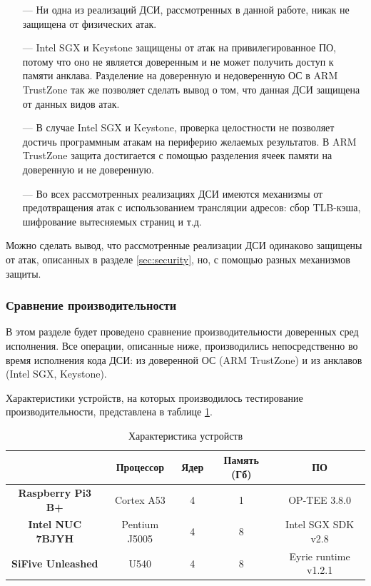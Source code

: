 \begin{itemize}
	\item [---] Ни одна из реализаций ДСИ, рассмотренных в данной работе, никак не защищена от физических атак.
	\item [---] Intel SGX и Keystone защищены от атак на привилегированное ПО, потому что оно не является доверенным и не может получить доступ к памяти анклава. Разделение на доверенную и недоверенную ОС в ARM TrustZone так же позволяет сделать вывод о том, что данная ДСИ защищена от данных видов атак.
	\item [---] В случае Intel SGX и Keystone, проверка целостности не позволяет достичь программным атакам на периферию желаемых результатов. В ARM TrustZone защита достигается с помощью разделения ячеек памяти на доверенную и не доверенную.
	\item [---] Во всех рассмотренных реализациях ДСИ имеются механизмы от предотвращения атак с использованием трансляции адресов: сбор TLB-кэша, шифрование вытесняемых страниц и т.д.
\end{itemize}

Можно сделать вывод, что рассмотренные реализации ДСИ одинаково защищены от атак, описанных в разделе \ref{sec:security}, но, с помощью разных механизмов защиты.

\subsubsection{Сравнение производительности}

В этом разделе будет проведено сравнение производительности доверенных сред исполнения. Все операции, описанные ниже, производились непосредственно во время исполнения кода ДСИ: из доверенной ОС (ARM TrustZone) и из анклавов (Intel SGX, Keystone).

Характеристики устройств, на которых производилось тестирование производительности, представлена в таблице \ref{table:perf-devices}.

\begin{table}[!htb]
	\begin{center}
		\caption{Характеристика устройств}
		\label{table:perf-devices}
		\begin{tabular}{|c|c|c|c|c|}
			\hline
			& \bfseries Процессор & \bfseries Ядер & \bfseries Память (Гб) & \bfseries ПО \\
			\hline
			\bfseries Raspberry Pi3 B+ & Cortex A53 & 4 & 1 & OP-TEE 3.8.0\\ \hline
			\bfseries Intel NUC 7BJYH & Pentium J5005 & 4 & 8 & Intel SGX SDK v2.8\\ \hline
			\bfseries SiFive Unleashed & U540 & 4 & 8 & Eyrie runtime v1.2.1\\ \hline
		\end{tabular}
	\end{center}
\end{table}

